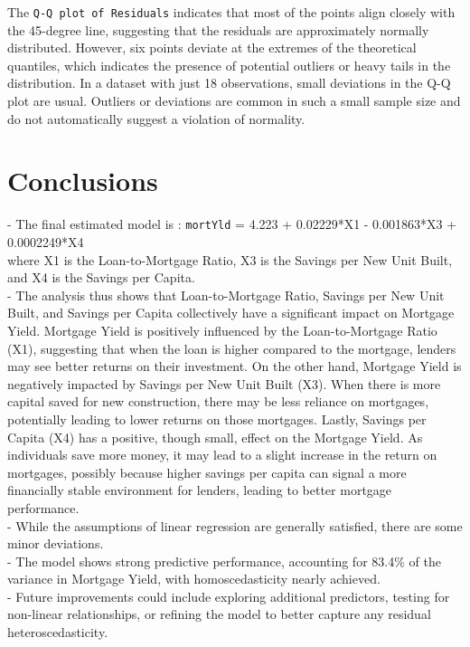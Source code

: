\documentclass[
  11pt,
]{article}
\begin{document}
The \texttt{Q-Q\ plot\ of\ Residuals} indicates that most of the points
align closely with the 45-degree line, suggesting that the residuals are
approximately normally distributed. However, six points deviate at the
extremes of the theoretical quantiles, which indicates the presence of
potential outliers or heavy tails in the distribution. In a dataset with
just 18 observations, small deviations in the Q-Q plot are usual.
Outliers or deviations are common in such a small sample size and do not
automatically suggest a violation of normality.

\section{Conclusions}\label{conclusions}

\hfill\break
- The final estimated model is : \texttt{mortYld} = 4.223 + 0.02229*X1 -
0.001863*X3 + 0.0002249*X4\\
where X1 is the Loan-to-Mortgage Ratio, X3 is the Savings per New Unit
Built, and X4 is the Savings per Capita.\\
- The analysis thus shows that Loan-to-Mortgage Ratio, Savings per New
Unit Built, and Savings per Capita collectively have a significant
impact on Mortgage Yield. Mortgage Yield is positively influenced by the
Loan-to-Mortgage Ratio (X1), suggesting that when the loan is higher
compared to the mortgage, lenders may see better returns on their
investment. On the other hand, Mortgage Yield is negatively impacted by
Savings per New Unit Built (X3). When there is more capital saved for
new construction, there may be less reliance on mortgages, potentially
leading to lower returns on those mortgages. Lastly, Savings per Capita
(X4) has a positive, though small, effect on the Mortgage Yield. As
individuals save more money, it may lead to a slight increase in the
return on mortgages, possibly because higher savings per capita can
signal a more financially stable environment for lenders, leading to
better mortgage performance.\\
- While the assumptions of linear regression are generally satisfied,
there are some minor deviations.\\
- The model shows strong predictive performance, accounting for 83.4\%
of the variance in Mortgage Yield, with homoscedasticity nearly
achieved.\\
- Future improvements could include exploring additional predictors,
testing for non-linear relationships, or refining the model to better
capture any residual heteroscedasticity.
\end{document}
